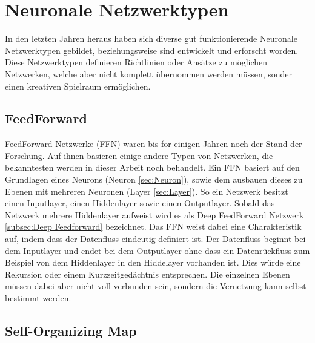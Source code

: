 \section{Neuronale Netzwerktypen}

In den letzten Jahren heraus haben sich diverse gut funktionierende Neuronale Netzwerktypen gebildet,  beziehungsweise sind entwickelt und erforscht worden. 
Diese Netzwerktypen definieren Richtlinien oder Ansätze zu möglichen Netzwerken, welche aber nicht komplett übernommen werden müssen, sonder einen kreativen Spielraum ermöglichen. \\


\subsection{FeedForward}
\label{subsec:FeedForward}

FeedForward Netzwerke (FFN) waren bis for einigen Jahren noch der Stand der Forschung.
Auf ihnen basieren einige andere Typen von Netzwerken, die bekanntesten werden in dieser Arbeit noch behandelt.
Ein FFN basiert auf den Grundlagen eines Neurons (Neuron \ref{sec:Neuron}), sowie dem ausbauen dieses zu Ebenen mit mehreren Neuronen (Layer \ref{sec:Layer}).
So ein Netzwerk besitzt einen Inputlayer, einen Hiddenlayer sowie einen Outputlayer.
Sobald das Netzwerk mehrere Hiddenlayer aufweist wird es als Deep FeedForward Netzwerk \ref{subsec:Deep Feedforward} bezeichnet.
Das FFN weist dabei eine Charakteristik auf, indem dass der Datenfluss eindeutig definiert ist. 
Der Datenfluss beginnt bei dem Inputlayer und endet bei dem Outputlayer ohne dass ein Datenrückfluss zum Beispiel von dem Hiddenlayer in den Hiddelayer vorhanden ist.
Dies würde eine Rekursion oder einem Kurzzeitgedächtnis entsprechen.
Die einzelnen Ebenen müssen dabei aber nicht voll verbunden sein, sondern die Vernetzung kann selbst bestimmt werden.

\subsection{Self-Organizing Map}

